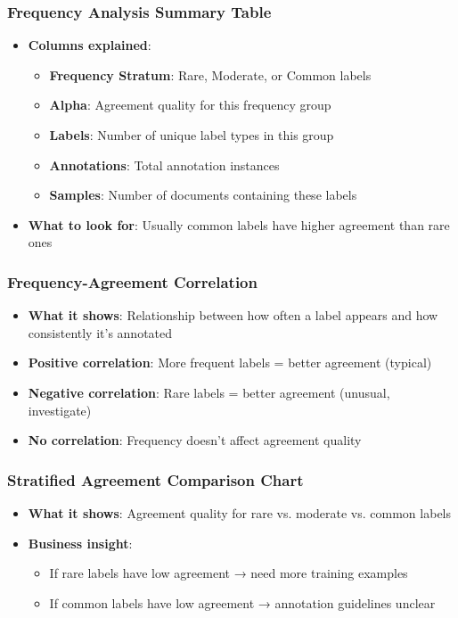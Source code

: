 \documentclass[11pt]{article}
\begin{document}
\subsubsection{Frequency Analysis Summary Table}
\begin{itemize}
\item \textbf{Columns explained}:
\begin{itemize}
\item \textbf{Frequency Stratum}: Rare, Moderate, or Common labels
\item \textbf{Alpha}: Agreement quality for this frequency group
\item \textbf{Labels}: Number of unique label types in this group
\item \textbf{Annotations}: Total annotation instances
\item \textbf{Samples}: Number of documents containing these labels
\end{itemize}
\item \textbf{What to look for}: Usually common labels have higher agreement than rare ones
\end{itemize}

\subsubsection{Frequency-Agreement Correlation}
\begin{itemize}
\item \textbf{What it shows}: Relationship between how often a label appears and how consistently it's annotated
\item \textbf{Positive correlation}: More frequent labels = better agreement (typical)
\item \textbf{Negative correlation}: Rare labels = better agreement (unusual, investigate)
\item \textbf{No correlation}: Frequency doesn't affect agreement quality
\end{itemize}

\subsubsection{Stratified Agreement Comparison Chart}
\begin{itemize}
\item \textbf{What it shows}: Agreement quality for rare vs. moderate vs. common labels
\item \textbf{Business insight}: 
\begin{itemize}
\item If rare labels have low agreement → need more training examples
\item If common labels have low agreement → annotation guidelines unclear
\end{itemize}
\end{itemize}
\end{document}
